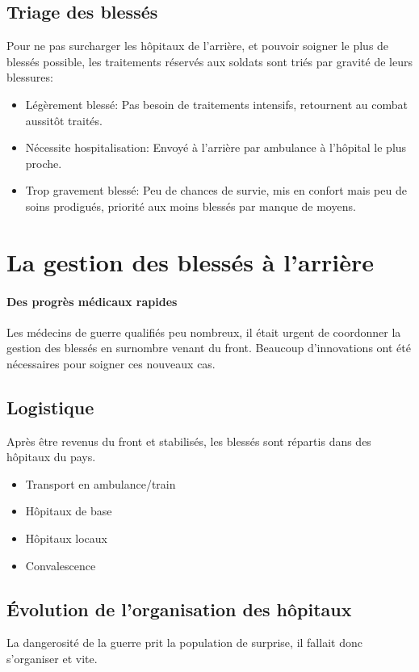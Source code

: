 \documentclass[a4paper, BCOR=0mm, fontsize=12pt, titlepage=firstiscover]{scrreprt}
\begin{document}
		\subsection{Triage des blessés}
			Pour ne pas surcharger les hôpitaux de l'arrière, et pouvoir soigner le plus de blessés possible, les traitements réservés aux soldats sont triés par gravité de leurs blessures:
			\begin{itemize}
				\item Légèrement blessé: Pas besoin de traitements intensifs, retournent au combat aussitôt traités.
				\item Nécessite hospitalisation: Envoyé à l'arrière par ambulance à l'hôpital le plus proche.
				\item Trop gravement blessé: Peu de chances de survie, mis en confort mais peu de soins prodigués, priorité aux moins blessés par manque de moyens. %
			\end{itemize}
	\newpage

	\section{La gestion des blessés à l'arrière}
		
		\paragraph{Des progrès médicaux rapides}
		Les médecins de guerre qualifiés peu nombreux, il était urgent de coordonner la gestion des blessés en surnombre venant du front.
		Beaucoup d'innovations ont été nécessaires pour soigner ces nouveaux cas.
		
		
		\subsection{Logistique}
		Après être revenus du front et stabilisés, les blessés sont répartis dans des hôpitaux du pays.
		
		\begin{itemize}
			\item Transport en ambulance/train
			\item Hôpitaux de base
			\item Hôpitaux locaux
			\item Convalescence
		\end{itemize}
		\subsection{\'Evolution de l'organisation des hôpitaux}
		La dangerosité de la guerre prit la population de surprise, il fallait donc s'organiser et vite.
		
\end{document}
